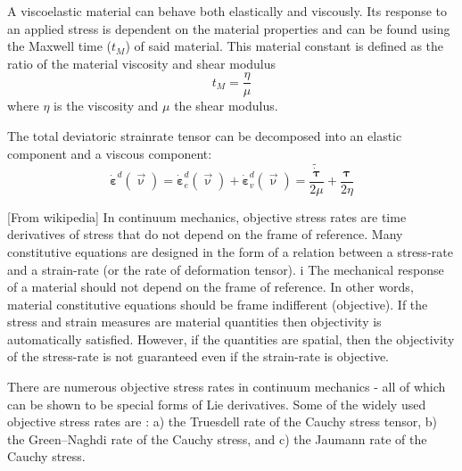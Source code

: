 

A viscoelastic material can behave both elastically and viscously. Its response to 
an applied stress is dependent on the material properties and can be found using 
the Maxwell time ($t_M$) of said material. 
This material constant is defined as the ratio of the material viscosity and shear modulus
\[
t_M = \frac{\eta}{\mu}
\]
where $\eta$ is the viscosity and $\mu$ the shear modulus.

The total deviatoric strainrate tensor can be decomposed into an elastic component and a viscous component:
\[
\dot{{\bm \varepsilon}}^d(\vec\upnu) = 
\dot{{\bm \varepsilon}}^d_e(\vec\upnu)  + \dot{{\bm \varepsilon}}^d_v(\vec\upnu)= 
\frac{\tilde{\dot{\bm \tau}}}{2\mu}
+\frac{\bm \tau}{2 \eta}
\]

[From wikipedia] In continuum mechanics, objective stress rates are time derivatives of 
stress that do not depend on the frame of reference. 
Many constitutive equations are designed in the form of a relation between a 
stress-rate and a strain-rate (or the rate of deformation tensor). i
The mechanical response of a material should not depend on the frame of reference. 
In other words, material constitutive equations should be frame indifferent (objective). 
If the stress and strain measures are material quantities then objectivity is automatically 
satisfied. However, if the quantities are spatial, then the objectivity of the stress-rate 
is not guaranteed even if the strain-rate is objective.

There are numerous objective stress rates in continuum mechanics - 
all of which can be shown to be special forms of Lie derivatives. 
Some of the widely used objective stress rates are \cite{holm20}:
a) the Truesdell rate of the Cauchy stress tensor,
b) the Green–Naghdi rate of the Cauchy stress, and
c) the Jaumann rate of the Cauchy stress.

